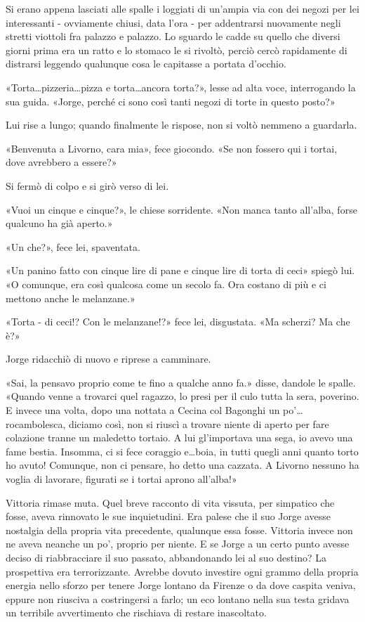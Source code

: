 Si erano appena lasciati alle spalle i loggiati di un'ampia via con dei negozi per lei interessanti - ovviamente chiusi, data l'ora - per addentrarsi nuovamente negli stretti viottoli fra palazzo e palazzo. Lo sguardo le cadde su quello che diversi giorni prima era un ratto e lo stomaco le si rivoltò, perciò cercò rapidamente di distrarsi leggendo qualunque cosa le capitasse a portata d'occhio.

«Torta\ldots pizzeria\ldots pizza e torta\ldots ancora torta?», lesse ad alta voce, interrogando la sua guida. «Jorge, perché ci sono così tanti negozi di torte in questo posto?»

Lui rise a lungo; quando finalmente le rispose, non si voltò nemmeno a guardarla.

«Benvenuta a Livorno, cara mia», fece giocondo. «Se non fossero qui i tortai, dove avrebbero a essere?»

Si fermò di colpo e si girò verso di lei.

«Vuoi un cinque e cinque?», le chiese sorridente. «Non manca tanto all'alba, forse qualcuno ha già aperto.»

«Un che?», fece lei, spaventata.

«Un panino fatto con cinque lire di pane e cinque lire di torta di ceci» spiegò lui. «O comunque, era così qualcosa come un secolo fa. Ora costano di più e ci mettono anche le melanzane.»

«Torta - di ceci!? Con le melanzane!?» fece lei, disgustata. «Ma scherzi? Ma che è?»

Jorge ridacchiò di nuovo e riprese a camminare.

«Sai, la pensavo proprio come te fino a qualche anno fa.» disse, dandole le spalle. «Quando venne a trovarci quel ragazzo, lo presi per il culo tutta la sera, poverino. E invece una volta, dopo una nottata a Cecina col Bagonghi un po'\ldots rocambolesca, diciamo così, non si riuscì a trovare niente di aperto per fare colazione tranne un maledetto tortaio. A lui gl'importava una sega, io avevo una fame bestia. Insomma, ci si fece coraggio e\ldots boia, in tutti quegli anni quanto torto ho avuto! Comunque, non ci pensare, ho detto una cazzata. A Livorno nessuno ha voglia di lavorare, figurati se i tortai aprono all'alba!»

Vittoria rimase muta. Quel breve racconto di vita vissuta, per simpatico che fosse, aveva rinnovato le sue inquietudini. Era palese che il suo Jorge avesse nostalgia della propria vita precedente, qualunque essa fosse. Vittoria invece non ne aveva neanche un po', proprio per niente. E se Jorge a un certo punto avesse deciso di riabbracciare il suo passato, abbandonando lei al suo destino? La prospettiva era terrorizzante. Avrebbe dovuto investire ogni grammo della propria energia nello sforzo per tenere Jorge lontano da Firenze o da dove caspita veniva, eppure non riusciva a costringersi a farlo; un eco lontano nella sua testa gridava un terribile avvertimento che rischiava di restare inascoltato.

